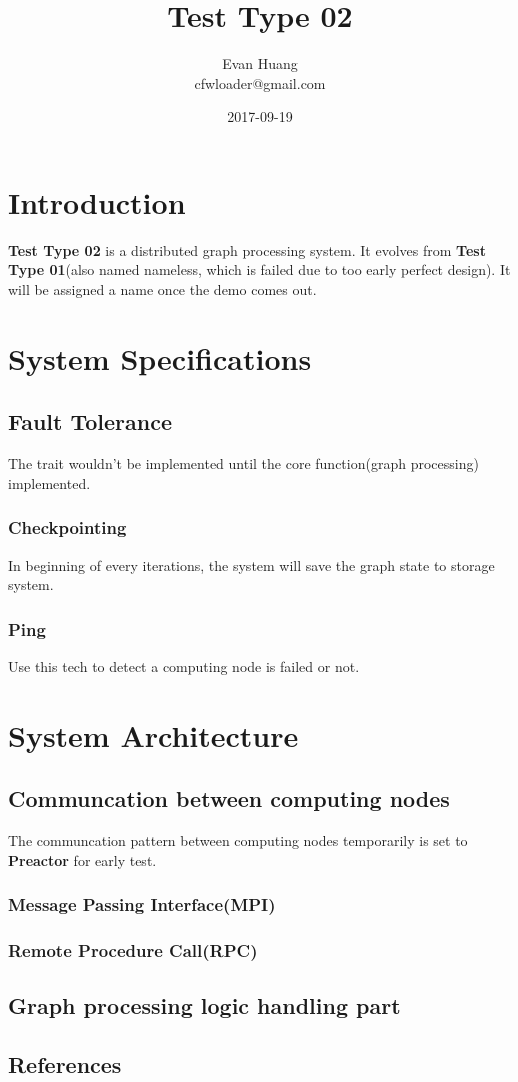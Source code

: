 \documentclass{article}
\title{Test Type 02}
\date{2017-09-19}
\author{Evan Huang \\ cfwloader@gmail.com}
\begin{document}
	\maketitle

	\newpage

	\tableofcontents


	\newpage

	\section{Introduction}
	\textbf{Test Type 02} is a distributed graph processing system. It evolves from \textbf{Test Type 01}(also named nameless, which is failed due to too early perfect design). It will be assigned a name once the demo comes out.

	\section{System Specifications}
	\subsection{Fault Tolerance}
	The trait wouldn't be implemented until the core function(graph processing) implemented.
	\subsubsection{Checkpointing}
	In beginning of every iterations, the system will save the graph state to storage system.
	\subsubsection{Ping}
	Use this tech to detect a computing node is failed or not.

	\section{System Architecture}
	\subsection{Communcation between computing nodes}
	The communcation pattern between computing nodes temporarily is set to \textbf{Preactor} for early test.
	\subsubsection{Message Passing Interface(MPI)}
	\subsubsection{Remote Procedure Call(RPC)}

	\subsection{Graph processing logic handling part}

	\begin{appendix}
		\section{References}
	\end{appendix}
\end{document}
